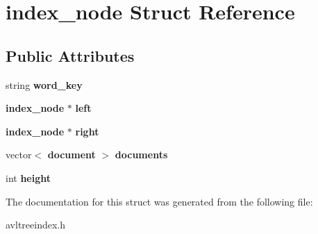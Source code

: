 \section{index\+\_\+node Struct Reference}
\label{structindex__node}
\subsection*{Public Attributes}
\begin{DoxyCompactItemize}
\item 
string {\bfseries word\+\_\+key}\label{structindex__node_a1a2e9b2dbf3e0208a16f4ca907c9e578}

\item 
{\bf index\+\_\+node} $\ast$ {\bfseries left}\label{structindex__node_a45b8fb67fb23923d9201a838d0afa54e}

\item 
{\bf index\+\_\+node} $\ast$ {\bfseries right}\label{structindex__node_a79288aaf4380e0689ba1191f632f1919}

\item 
vector$<$ {\bf document} $>$ {\bfseries documents}\label{structindex__node_ac30a2d3c128b8a88193eccf05efd1ba2}

\item 
int {\bfseries height}\label{structindex__node_a711a4ee7677aec85f96014f5b44dacd7}

\end{DoxyCompactItemize}


The documentation for this struct was generated from the following file\+:\begin{DoxyCompactItemize}
\item 
avltreeindex.\+h\end{DoxyCompactItemize}
